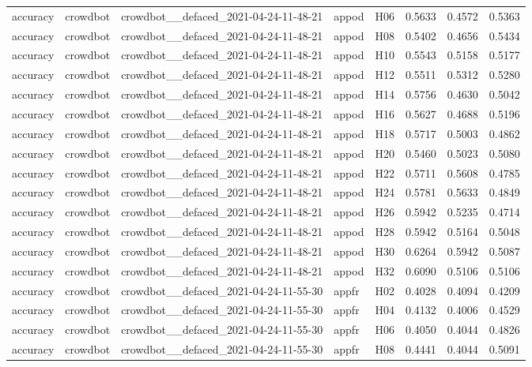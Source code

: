 \begin{table}[tbp]
\begin{tabular}{lllllrrr}
accuracy & crowdbot & crowdbot\_\_defaced\_2021-04-24-11-48-21 & appod & H06 & 0.5633 & 0.4572 & 0.5363 \\
accuracy & crowdbot & crowdbot\_\_defaced\_2021-04-24-11-48-21 & appod & H08 & 0.5402 & 0.4656 & 0.5434 \\
accuracy & crowdbot & crowdbot\_\_defaced\_2021-04-24-11-48-21 & appod & H10 & 0.5543 & 0.5158 & 0.5177 \\
accuracy & crowdbot & crowdbot\_\_defaced\_2021-04-24-11-48-21 & appod & H12 & 0.5511 & 0.5312 & 0.5280 \\
accuracy & crowdbot & crowdbot\_\_defaced\_2021-04-24-11-48-21 & appod & H14 & 0.5756 & 0.4630 & 0.5042 \\
accuracy & crowdbot & crowdbot\_\_defaced\_2021-04-24-11-48-21 & appod & H16 & 0.5627 & 0.4688 & 0.5196 \\
accuracy & crowdbot & crowdbot\_\_defaced\_2021-04-24-11-48-21 & appod & H18 & 0.5717 & 0.5003 & 0.4862 \\
accuracy & crowdbot & crowdbot\_\_defaced\_2021-04-24-11-48-21 & appod & H20 & 0.5460 & 0.5023 & 0.5080 \\
accuracy & crowdbot & crowdbot\_\_defaced\_2021-04-24-11-48-21 & appod & H22 & 0.5711 & 0.5608 & 0.4785 \\
accuracy & crowdbot & crowdbot\_\_defaced\_2021-04-24-11-48-21 & appod & H24 & 0.5781 & 0.5633 & 0.4849 \\
accuracy & crowdbot & crowdbot\_\_defaced\_2021-04-24-11-48-21 & appod & H26 & 0.5942 & 0.5235 & 0.4714 \\
accuracy & crowdbot & crowdbot\_\_defaced\_2021-04-24-11-48-21 & appod & H28 & 0.5942 & 0.5164 & 0.5048 \\
accuracy & crowdbot & crowdbot\_\_defaced\_2021-04-24-11-48-21 & appod & H30 & 0.6264 & 0.5942 & 0.5087 \\
accuracy & crowdbot & crowdbot\_\_defaced\_2021-04-24-11-48-21 & appod & H32 & 0.6090 & 0.5106 & 0.5106 \\
accuracy & crowdbot & crowdbot\_\_defaced\_2021-04-24-11-55-30 & appfr & H02 & 0.4028 & 0.4094 & 0.4209 \\
accuracy & crowdbot & crowdbot\_\_defaced\_2021-04-24-11-55-30 & appfr & H04 & 0.4132 & 0.4006 & 0.4529 \\
accuracy & crowdbot & crowdbot\_\_defaced\_2021-04-24-11-55-30 & appfr & H06 & 0.4050 & 0.4044 & 0.4826 \\
accuracy & crowdbot & crowdbot\_\_defaced\_2021-04-24-11-55-30 & appfr & H08 & 0.4441 & 0.4044 & 0.5091 \\

\end{tabular}
\end{table}
